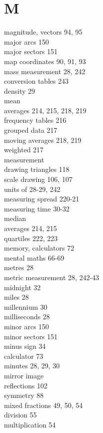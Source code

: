 \documentclass[10pt]{article}
\begin{document}
\section*{M}
magnitude, vectors 94, 95\\
major arcs 150\\
major sectors 151\\
map coordinates 90, 91, 93\\
mass measurement 28, 242\\
conversion tables 243\\
density 29\\
mean\\
averages 214, 215, 218, 219\\
frequency tables 216\\
grouped data 217\\
moving averages 218, 219\\
weighted 217\\
measurement\\
drawing triangles 118\\
scale drawing 106, 107\\
units of 28-29, 242\\
measuring spread 220-21\\
measuring time 30-32\\
median\\
averages 214, 215\\
quartiles 222, 223\\
memory, calculators 72\\
mental maths 66-69\\
metres 28\\
metric measurement 28, 242-43\\
midnight 32\\
miles 28\\
millennium 30\\
milliseconds 28\\
minor arcs 150\\
minor sectors 151\\
minus sign 34\\
calculator 73\\
minutes 28, 29, 30\\
mirror image\\
reflections 102\\
symmetry 88\\
mixed fractions 49, 50, 54\\
division 55\\
multiplication 54\\
\end{document}
